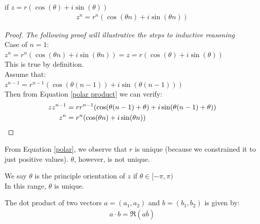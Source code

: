 \begin{theorem}
    if $z = r(\cos(\theta) + i\sin(\theta))$
    \begin{align}
        z^n = r^n(\cos(\theta n) + i\sin(\theta n)) \label{Moivre}
    \end{align}
\end{theorem}

\begin{proof}
    \textit{The following proof will illustrative the steps to inductive reasoning}\\
    Case of $n = 1$: $z^n = r^n(\cos(\theta n) + i\sin(\theta n)) = z = r(\cos(\theta) + i\sin(\theta))$ \\
    This is true by definition. \\
    Assume that: \\
    $z^{n-1} = r^{n-1}(\cos(\theta (n-1)) + i\sin(\theta (n-1)))$ \\
    Then from Equation \eqref{polar product} we can verify: \\
    \begin{align}
        zz^{n-1} & = rr^{n-1}(\cos(\theta (n-1) + \theta) + i\sin(\theta (n-1) + \theta)) \notag \\
        z^{n}    & = r^{n}(\cos(\theta n) + i\sin(\theta n)) \notag
    \end{align}
\end{proof}

From Equation \eqref{polar}, we observe that $r$ is unique (because we constrained it to just positive values). $\theta$, however, is not unique.

\begin{definition}
    We say $\theta$ is the principle orientation of $z$ if $\theta \in [-\pi, \pi)$ \\
    In this range, $\theta$ is unique.
\end{definition}

\begin{definition}
     The dot product of two vectors $a = (a_1, a_2)$ and $b = (b_1, b_2)$ is given by:
    \begin{align}
        a \cdot b  = \Re(a\overline{b})
        \label{dot product}
    \end{align}
\end{definition}

